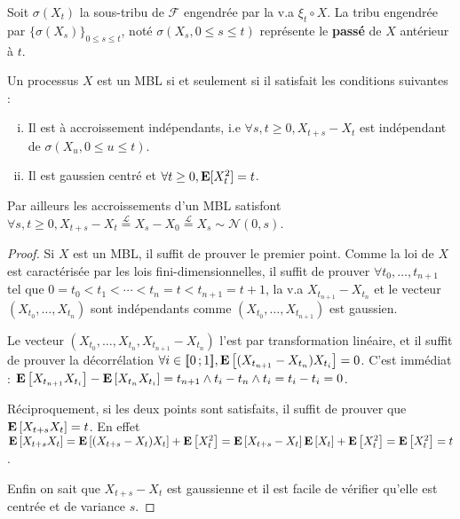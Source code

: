 	\begin{defn}
		Soit $\sigma(X_t)$ la sous-tribu de $\mathcal{F}$ engendrée par la v.a $\xi_t \circ X$.
		La tribu engendrée par $\{ \sigma(X_s) \}_{0 \leq s \leq t}$, noté $\sigma(X_s, 0 \leq s \leq t)$ représente le \textbf{passé} de $X$ antérieur à $t$.
	\end{defn}
	
	\begin{pop}
		Un processus $X$ est un MBL si et seulement si il satisfait les conditions suivantes :
		\begin{enumerate}[(i)]
			\item Il est à accroissement indépendants, i.e $\forall s,t \geq 0, X_{t+s} - X_t$ est indépendant de $\sigma(X_u, 0 \leq u \leq t)$.
			\item Il est gaussien centré et $\forall t \geq 0, \mathbf{E}[X_t^2] = t$.
		\end{enumerate}
		Par ailleurs les accroissements d'un MBL satisfont $\forall s,t \geq 0, X_{t+s} - X_t \overset{\mathcal{L}}{=} X_s - X_0 \overset{\mathcal{L}}{=} X_s \sim \mathcal{N}(0,s)$.
	\end{pop}
	
	\begin{proof}
		Si $X$ est un MBL, il suffit de prouver le premier point.
		Comme la loi de $X$ est caractérisée par les lois fini-dimensionnelles, il suffit de prouver $\forall t_0,\ldots,t_{n + 1}$ tel que $0 = t_0 < t_1 < \cdots < t_n = t < t_{n + 1} = t + 1$, la v.a $X_{t_{n + 1}} - X_{t_n}$ et le vecteur $(X_{t_0},\ldots,X_{t_n})$ sont indépendants comme $(X_{t_0},\ldots,X_{t_{n + 1}})$ est gaussien.
		
		Le vecteur $(X_{t_0},\ldots,X_{t_n},X_{t_{n + 1}} - X_{t_n})$ l'est par transformation linéaire, et il suffit de prouver la décorrélation $\forall i \in \mathopen{[\![}0\mathclose{}\mathpunct{};1\mathclose{]\!]}, \mathbf{E} \left[ (X_{t_{n + 1}} - X_{t_n}) X_{t_i} \right] = 0$.
		C'est immédiat : $\mathbf{E} \left[ X_{t_{n + 1}} X_{t_i} \right] - \mathbf{E} \left[ X_{t_n} X_{t_i} \right] = t_{n + 1} \wedge t_i - t_n \wedge t_i = t_i - t_i = 0$.
		
		Réciproquement, si les deux points sont satisfaits, il suffit de prouver que $\mathbf{E} \left[ X_{t + s} X_t \right] = t$.
		En effet $\mathbf{E} \left[ X_{t + s} X_t \right] = \mathbf{E} \left[ (X_{t + s} - X_t) X_t \right] + \mathbf{E} \left[ X_t^2 \right] = \mathbf{E} \left[ X_{t + s} - X_t \right] \mathbf{E} \left[ X_t \right] + \mathbf{E} \left[ X_t^2 \right] = \mathbf{E} \left[ X_t^2 \right] = t$.
		
		Enfin on sait que $X_{t + s} - X_t$ est gaussienne et il est facile de vérifier qu'elle est centrée et de variance $s$.
	\end{proof}
	
